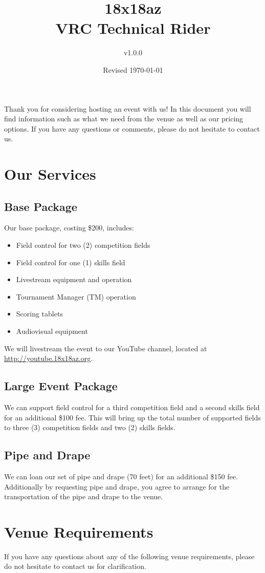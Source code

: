\documentclass[12pt]{article}
\title{18x18az\\VRC Technical Rider}
\author{v1.0.0}
\date{Revised \today}
\begin{document}
\maketitle
Thank you for considering hosting an event with us!
In this document you will find information such as what we need from the venue as well as our pricing options.
If you have any questions or comments, please do not hesitate to contact us.
\tableofcontents
\pagebreak
\section{Our Services}
\subsection{Base Package}
Our base package, costing \$200, includes:
\begin{itemize}
    \item Field control for two (2) competition fields
    \item Field control for one (1) skills field
    \item Livestream equipment and operation
    \item Tournament Manager (TM) operation
    \item Scoring tablets
    \item Audiovisual equipment
\end{itemize}

\noindent We will livestream the event to our YouTube channel, located at \\\url{http://youtube.18x18az.org}.

\subsection{Large Event Package}
We can support field control for a third competition field and a second skills field for an additional \$100 fee.
This will bring up the total number of supported fields to three (3) competition fields and two (2) skills fields.

\subsection{Pipe and Drape}
We can loan our set of pipe and drape (70 feet) for an additional \$150 fee.
Additionally by requesting pipe and drape, you agree to arrange for the transportation of the pipe and drape to the venue.

\section{Venue Requirements}
If you have any questions about any of the following venue requirements, please do not hesitate to contact us for clarification.
\end{document}
